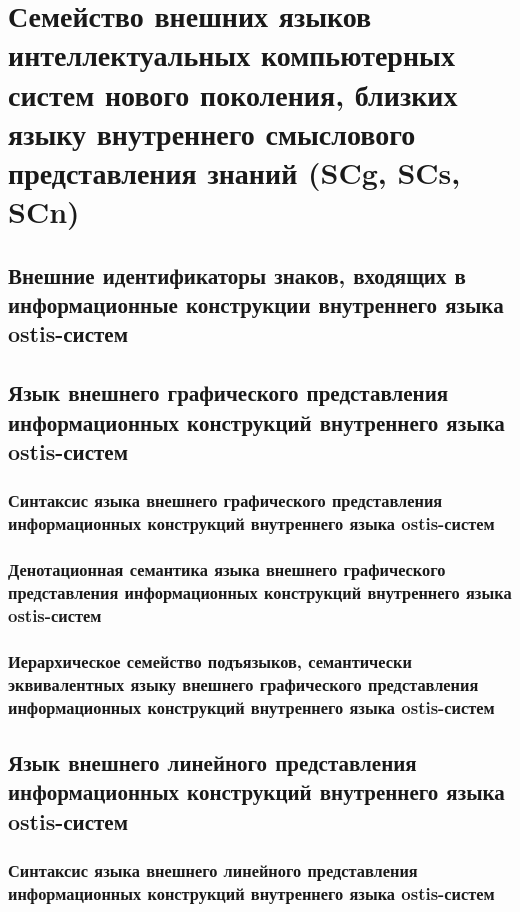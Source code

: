 \chapter{Семейство внешних языков интеллектуальных компьютерных систем нового поколения, близких языку внутреннего смыслового представления знаний (SCg, SCs, SCn)}
\label{chapter_ext_lang}


\section{Внешние идентификаторы знаков, входящих в информационные конструкции внутреннего языка ostis-систем}
\section{Язык внешнего графического представления информационных конструкций внутреннего языка ostis-систем}
\subsection{Синтаксис языка внешнего графического представления информационных конструкций внутреннего языка ostis-систем}
\subsection{Денотационная семантика языка внешнего графического представления информационных конструкций внутреннего языка ostis-систем}
\subsection{Иерархическое семейство подъязыков, семантически эквивалентных языку внешнего графического представления информационных конструкций внутреннего языка ostis-систем}
\section{Язык внешнего линейного представления информационных конструкций внутреннего языка ostis-систем}
\subsection{Синтаксис языка внешнего линейного представления информационных конструкций внутреннего языка ostis-систем}
